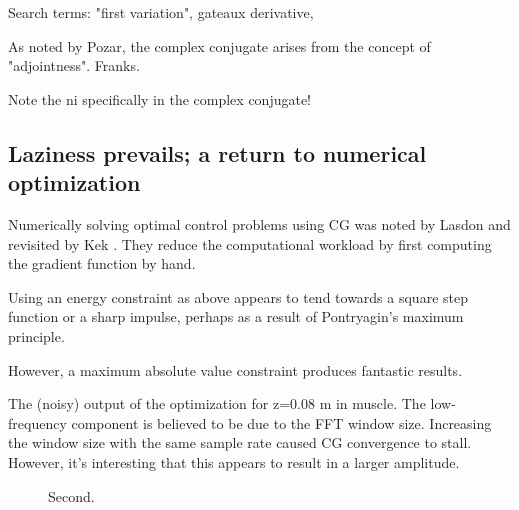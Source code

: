 \documentclass[paper.tex]{subfiles}
\begin{document}
Search terms: "first variation", gateaux derivative, 

As noted by Pozar, the complex conjugate arises from the concept of "adjointness". Franks.

Note the ni specifically in the complex conjugate!


\subsection{Laziness prevails; a return to numerical optimization}

Numerically solving optimal control problems using CG was noted by Lasdon \cite{conjugate1967} and 
revisited by Kek \cite{Conjugate}. They reduce the computational workload by first computing the 
gradient function by hand.

Using an energy constraint as above appears to tend towards a square step function or a sharp impulse, perhaps as a result of Pontryagin's maximum principle\cite{Optimum1964}.

However, a maximum absolute value constraint produces fantastic results.


\begin{figure}[H]
	
	\caption{}
\end{figure}


The (noisy) output of the optimization for z=0.08 m in muscle. The low-frequency component is believed to be due to the FFT window size. Increasing the window size with the same sample rate caused CG convergence to stall. However, it's interesting that this appears to result in a larger amplitude. 


\begin{figure}[H]
	
	\caption{Second.}
\end{figure}
\end{document}
